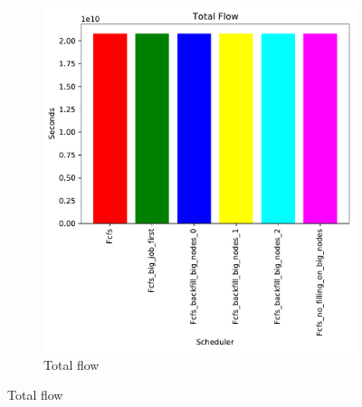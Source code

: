 \documentclass[a4paper]{article}
\begin{document}
\begin{figure}[H]
	\begin{subfigure}[b]{0.4\linewidth}\centering\includegraphics[width=1\linewidth]{MBSS/plot/Size_Constraint_2022-03-26->2022-03-26_Total_flow_95_128_4_256_1_1024.pdf}\caption{Total flow}\end{subfigure}

\end{figure}
\end{document}

